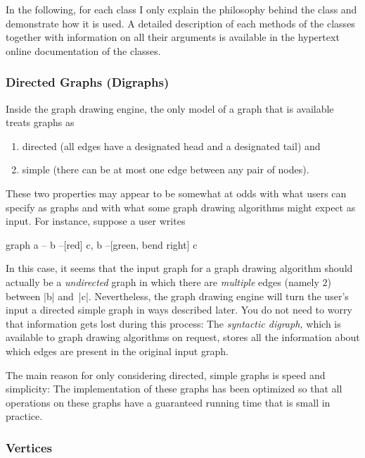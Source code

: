 In the following, for each class I only explain the philosophy behind
the class and demonstrate how it is used. A detailed description of
each methods of the classes together with information on all their
arguments is available in the hypertext online documentation of the
classes.


\subsubsection{Directed Graphs (Digraphs)}

Inside the graph drawing engine, the only model of a graph that is 
available treats graphs as
\begin{enumerate}
\item directed (all edges have a designated head and a designated
  tail) and
\item simple (there can be at most one edge between any pair of
  nodes). 
\end{enumerate}
These two properties may appear to be somewhat at odds with what users
can specify as graphs and with what some graph drawing algorithms
might expect as input. For instance, suppose a user writes
\begin{codeexample}
graph { a -- b --[red] c, b --[green, bend right] c }
\end{codeexample}
In this case, it seems that the input graph for a graph drawing
algorithm should actually be a \emph{undirected} graph in which there
are \emph{multiple} edges (namely $2$) between |b| and~|c|.
Nevertheless, the graph drawing engine will turn the user's input a
directed simple graph in ways described later. You do not need to
worry that information gets lost during this process: The
\emph{syntactic digraph,} which is available to graph drawing
algorithms on request, stores all the information about which edges
are present in the original input graph.

The main reason for only considering directed, simple graphs is speed
and simplicity: The implementation of these graphs has been optimized so
that all operations on these graphs have a guaranteed running time
that is small in practice. 


\subsubsection{Vertices}


